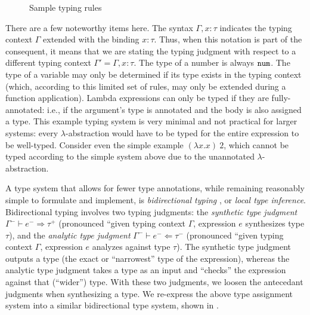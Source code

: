 \begin{figure}
  \centering
  \begin{mdframed}
    \begin{singlespace}
    \end{singlespace}
  \end{mdframed}
  \caption{Sample typing rules}
  \label{fig:sample-typing-rules}
\end{figure}

There are a few noteworthy items here. The syntax $\Gamma,x:\tau$ indicates the typing context $\Gamma$ extended with the binding $x:\tau$. Thus, when this notation is part of the consequent, it means that we are stating the typing judgment with respect to a different typing context $\Gamma'=\Gamma,x:\tau$. The type of a number is always $\mathtt{num}$. The type of a variable may only be determined if its type exists in the typing context (which, according to this limited set of rules, may only be extended during a function application). Lambda expressions can only be typed if they are fully-annotated: i.e., if the argument's type is annotated and the body is also assigned a type. This example typing system is very minimal and not practical for larger systems: every $\lambda$-abstraction would have to be typed for the entire expression to be well-typed. Consider even the simple example $(\lambda x.x)\ 2$, which cannot be typed according to the simple system above due to the unannotated $\lambda$-abstraction.

A type system that allows for fewer type annotations, while remaining reasonably simple to formulate and implement, is \textit{bidirectional typing} \cite{Dunfield_2022,chlipala2005strict,pierce2000local}, or \textit{local type inference}. Bidirectional typing involves two typing judgments: the \textit{synthetic type judgment} $\Gamma^-\vdash e^-\Rightarrow\tau^+$ (pronounced ``given typing context $\Gamma$, expression $e$ synthesizes type $\tau$), and the \textit{analytic type judgment} $\Gamma^-\vdash e^-\Leftarrow\tau^-$ (pronounced ``given typing context $\Gamma$, expression $e$ analyzes against type $\tau$). The synthetic type judgment outputs a type (the exact or ``narrowest'' type of the expression), whereas the analytic type judgment takes a type as an input and ``checks'' the expression against that (``wider'') type. With these two judgments, we loosen the antecedant judgments when synthesizing a type. We re-express the above type assignment system into a similar bidirectional type system, shown in .

